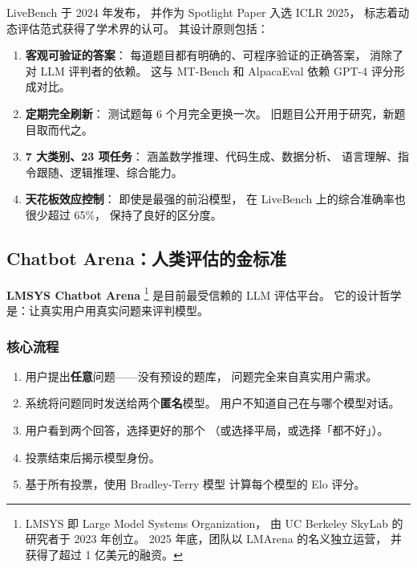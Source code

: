 LiveBench 于 2024 年发布，
并作为 Spotlight Paper 入选 ICLR 2025，
标志着动态评估范式获得了学术界的认可。
其设计原则包括：

\begin{enumerate}[noitemsep]
  \item \textbf{客观可验证的答案}：
        每道题目都有明确的、可程序验证的正确答案，
        消除了对 LLM 评判者的依赖。
        这与 MT-Bench 和 AlpacaEval 依赖 GPT-4 评分形成对比。
  \item \textbf{定期完全刷新}：
        测试题每 6 个月完全更换一次。
        旧题目公开用于研究，新题目取而代之。
  \item \textbf{7 大类别、23 项任务}：
        涵盖数学推理、代码生成、数据分析、
        语言理解、指令跟随、逻辑推理、综合能力。
  \item \textbf{天花板效应控制}：
        即使是最强的前沿模型，
        在 LiveBench 上的综合准确率也很少超过 65\%，
        保持了良好的区分度。
\end{enumerate}

\subsection{Chatbot Arena：人类评估的金标准}
\label{subsec:chatbot-arena}

\textbf{LMSYS Chatbot Arena}%
\footnote{LMSYS 即 Large Model Systems Organization，
由 UC Berkeley SkyLab 的研究者于 2023 年创立。
2025 年底，团队以 LMArena 的名义独立运营，
并获得了超过 1 亿美元的融资。}
是目前最受信赖的 LLM 评估平台。
它的设计哲学是：让真实用户用真实问题来评判模型。

\subsubsection{核心流程}

\begin{enumerate}[noitemsep]
  \item 用户提出\textbf{任意}问题——没有预设的题库，
        问题完全来自真实用户需求。
  \item 系统将问题同时发送给两个\textbf{匿名}模型。
        用户不知道自己在与哪个模型对话。
  \item 用户看到两个回答，选择更好的那个
        （或选择平局，或选择「都不好」）。
  \item 投票结束后揭示模型身份。
  \item 基于所有投票，使用 Bradley-Terry 模型
        计算每个模型的 Elo 评分。
\end{enumerate}

